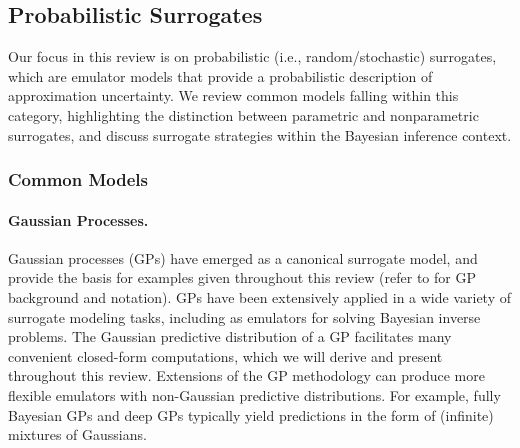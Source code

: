 \documentclass[12pt]{article}
\begin{document}
\subsection{Probabilistic Surrogates}
Our focus in this review is on probabilistic (i.e., random/stochastic) surrogates, which 
are emulator models that provide a probabilistic description of approximation uncertainty.
We review common models falling within this category, highlighting the distinction
between parametric and nonparametric surrogates, and discuss surrogate strategies within
the Bayesian inference context.

\subsubsection{Common Models}

\paragraph{Gaussian Processes.}
Gaussian processes (GPs) have emerged as a canonical surrogate model, and provide the 
basis for examples given throughout this review (refer to  for GP
background and notation). GPs have been extensively applied in a wide variety of 
surrogate modeling tasks, including as emulators for solving Bayesian inverse problems.
The Gaussian predictive distribution of a 
GP facilitates many convenient closed-form computations, which we will derive and present 
throughout this review. Extensions of the GP methodology can produce more flexible 
emulators with non-Gaussian predictive distributions. For example, fully Bayesian 
GPs \citep{fullyBayesianGPs} and deep GPs \citep{deepGPVecchia,deepGPAL}
typically yield predictions in the form of (infinite) mixtures of Gaussians.
\end{document}
